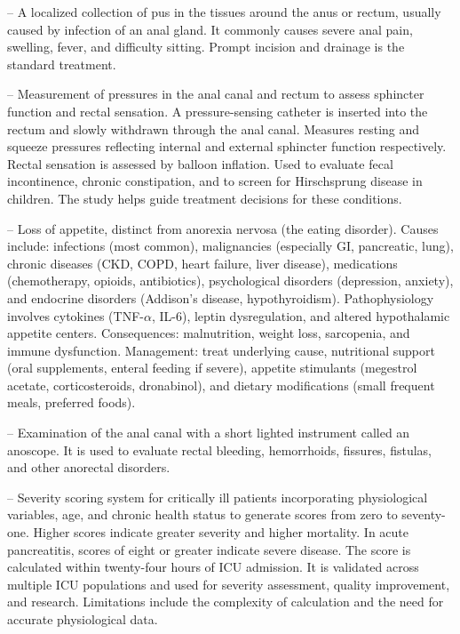 -- A localized collection of pus in the tissues around the anus or rectum, usually caused by infection of an anal gland. It commonly causes severe anal pain, swelling, fever, and difficulty sitting. Prompt incision and drainage is the standard treatment.

-- Measurement of pressures in the anal canal and rectum to assess sphincter function and rectal sensation. A pressure-sensing catheter is inserted into the rectum and slowly withdrawn through the anal canal. Measures resting and squeeze pressures reflecting internal and external sphincter function respectively. Rectal sensation is assessed by balloon inflation. Used to evaluate fecal incontinence, chronic constipation, and to screen for Hirschsprung disease in children. The study helps guide treatment decisions for these conditions.

-- Loss of appetite, distinct from anorexia nervosa (the eating disorder). Causes include: infections (most common), malignancies (especially GI, pancreatic, lung), chronic diseases (CKD, COPD, heart failure, liver disease), medications (chemotherapy, opioids, antibiotics), psychological disorders (depression, anxiety), and endocrine disorders (Addison's disease, hypothyroidism). Pathophysiology involves cytokines (TNF-$\alpha$, IL-6), leptin dysregulation, and altered hypothalamic appetite centers. Consequences: malnutrition, weight loss, sarcopenia, and immune dysfunction. Management: treat underlying cause, nutritional support (oral supplements, enteral feeding if severe), appetite stimulants (megestrol acetate, corticosteroids, dronabinol), and dietary modifications (small frequent meals, preferred foods).

-- Examination of the anal canal with a short lighted instrument called an anoscope. It is used to evaluate rectal bleeding, hemorrhoids, fissures, fistulas, and other anorectal disorders.

-- Severity scoring system for critically ill patients incorporating physiological variables, age, and chronic health status to generate scores from zero to seventy-one. Higher scores indicate greater severity and higher mortality. In acute pancreatitis, scores of eight or greater indicate severe disease. The score is calculated within twenty-four hours of ICU admission. It is validated across multiple ICU populations and used for severity assessment, quality improvement, and research. Limitations include the complexity of calculation and the need for accurate physiological data.

